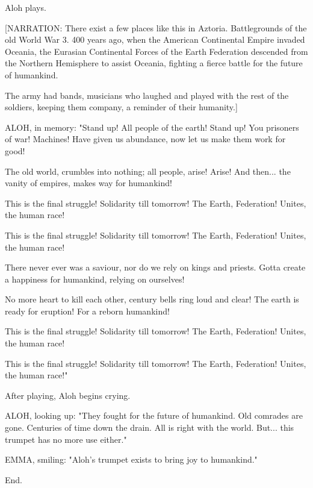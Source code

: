 \documentclass[11pt]{article}
\begin{document}
Aloh plays.

[NARRATION: There exist a few places like this in Aztoria. 
Battlegrounds of the old World War 3. 
400 years ago, when the American Continental Empire invaded Oceania, the Eurasian Continental Forces of the Earth Federation descended from the Northern Hemisphere to assist Oceania, fighting a fierce battle for the future of humankind.

The army had bands, musicians who laughed and played with the rest of the soldiers, keeping them company, a reminder of their humanity.]

ALOH, in memory: 
"Stand up! All people of the earth!
Stand up! You prisoners of war!
Machines! Have given us abundance,
now let us make them work for good!

The old world, crumbles into nothing;
all people, arise! Arise!
And then... the vanity of empires,
makes way for humankind!

This is the final struggle!
Solidarity till tomorrow!
The Earth, Federation!
Unites, the human race!

This is the final struggle!
Solidarity till tomorrow!
The Earth, Federation!
Unites, the human race!

There never ever was a saviour,
nor do we rely on kings and priests.
Gotta create a happiness for humankind,
relying on ourselves!

No more heart to kill each other,
century bells ring loud and clear!
The earth is ready for eruption!
For a reborn humankind!

This is the final struggle!
Solidarity till tomorrow!
The Earth, Federation!
Unites, the human race!

This is the final struggle!
Solidarity till tomorrow!
The Earth, Federation!
Unites, the human race!"

After playing, Aloh begins crying.

ALOH, looking up: "They fought for the future of humankind.
Old comrades are gone.
Centuries of time down the drain.
All is right with the world.
But... this trumpet has no more use either."

EMMA, smiling: "Aloh's trumpet exists to bring joy to humankind."

End.
\end{document}
